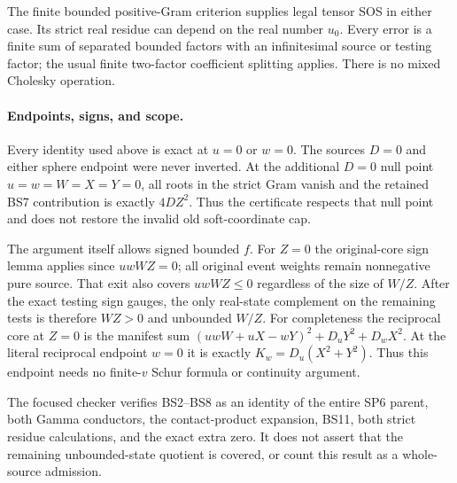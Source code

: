 The finite bounded positive-Gram criterion supplies legal tensor SOS
in either case. Its strict real residue can depend on the real number
$u_0$. Every error is a finite sum of separated bounded factors with
an infinitesimal source or testing factor; the usual finite two-factor
coefficient splitting applies. There is no mixed Cholesky operation.

\paragraph{Endpoints, signs, and scope.}
Every identity used above is exact at $u=0$ or $w=0$. The sources
$D=0$ and either sphere endpoint were never inverted. At the additional
$D=0$ null point $u=w=W=X=Y=0$, all roots in the strict Gram vanish
and the retained BS7 contribution is exactly $4DZ^2$.
Thus the certificate respects that null point and does not restore
the invalid old soft-coordinate cap.

The argument itself allows signed bounded $f$. For $Z=0$ the
original-core sign lemma applies since $uwWZ=0$; all original event
weights remain nonnegative pure source. That exit also covers
$uwWZ\le0$ regardless of the size of $W/Z$. After the exact testing
sign gauges, the only real-state complement on the remaining tests
is therefore $WZ>0$ and unbounded $W/Z$.
For completeness the reciprocal core at $Z=0$ is the manifest sum
$(uwW+uX-wY)^2+D_uY^2+D_wX^2$.
At the literal reciprocal endpoint $w=0$ it is exactly
$K_w=D_u(X^2+Y^2)$. Thus this endpoint needs no finite-$v$
Schur formula or continuity argument.

The focused checker verifies BS2--BS8 as an identity of the entire
SP6 parent, both Gamma conductors, the contact-product expansion,
BS11, both strict residue calculations, and the exact extra zero.
It does not assert that the remaining unbounded-state quotient is
covered, or count this result as a whole-source admission.
